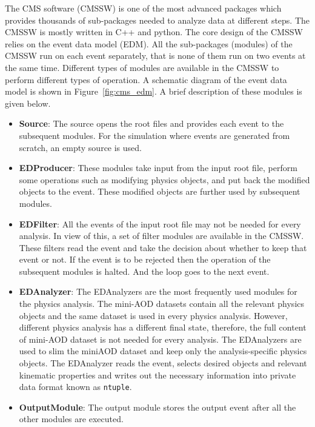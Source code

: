 The CMS software (CMSSW) is one of the most advanced packages which provides
thousands of sub-packages needed to analyze data at different steps. The CMSSW
is mostly written in C++ and python. The core design of the CMSSW relies on the 
event data model (EDM). All the sub-packages (modules) of the CMSSW run on each 
event separately, that is none of them run on two events at the same time. 
Different types of modules are available in the CMSSW to perform different types 
of operation. A schematic diagram of the event data model is shown in 
Figure~\ref{fig:cms_edm}. A brief description of these modules is given 
below.
\begin{itemize}[leftmargin=*]
\item \textbf{Source}: The source opens the root files and provides each event 
	to the subsequent modules. For the simulation where events are generated
	from scratch, an empty source is used. 
\item \textbf{EDProducer}: These modules take input from the input root file,
	perform some operations such as modifying physics objects, and put
	back the modified objects to the event. These modified objects are 
	further used by subsequent modules.
\item \textbf{EDFilter}: All the events of the input root file may not be needed
	for every analysis. In view of this, a set of filter modules are available
	in the CMSSW. These filters read the event and take the decision about 
	whether to keep that event or not. If the event is to be rejected then the 
	operation of the subsequent modules is halted. And the loop goes to the 
	next event. 
\item \textbf{EDAnalyzer}: The EDAnalyzers are the most frequently used modules for
	the physics analysis. The mini-AOD datasets contain all the relevant
	physics objects and the same dataset is used in every physics analysis. 
	However, different physics analysis has a different final state, therefore,
	the full content of mini-AOD dataset is not needed for every analysis.
	The EDAnalyzers are used to slim the miniAOD dataset and keep only the
	analysis-specific physics objects. The EDAnalyzer reads the event, 
	selects desired objects and relevant kinematic properties and writes out the
	necessary information into private data format known as \verb|ntuple|.
\item \textbf{OutputModule}: The output module stores the output event after
	all the other modules are executed.
\end{itemize}
